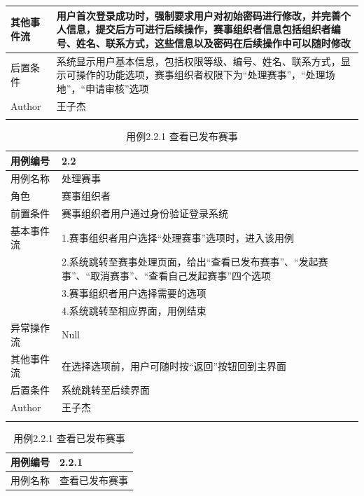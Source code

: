 \documentclass[a4paper,UTF8]{article}
\begin{document}
\begin{table}[H]
\begin{center}
\begin{tabular}{|p{}|p{}|}
		\hline
		其他事件流 & 用户首次登录成功时，强制要求用户对初始密码进行修改，并完善个人信息，提交后方可进行后续操作，赛事组织者信息包括组织者编号、姓名、联系方式，这些信息以及密码在后续操作中可以随时修改\\
		\hline
		后置条件 & 系统显示用户基本信息，包括权限等级、编号、姓名、联系方式，显示可操作的功能选项，赛事组织者权限下为“处理赛事”，“处理场地”，“申请审核”选项\\
		\hline
		Author & 王子杰 \\
		\noalign{\smallskip}
		\hline
		\noalign{\smallskip}
	\end{tabular}
\end{center}
\end{table}

\begin{table}[H]
	\begin{center}
		\caption{用例2.2 处理赛事}
		\label{table:Tab_uc22}
		\begin{tabular}{|p{}|p{}|}
			\hline\noalign{\smallskip}
			用例编号 & 2.2\\
			\hline
			用例名称 &  处理赛事\\
			\hline
			角色 & 赛事组织者\\
			\hline
			前置条件 & 赛事组织者用户通过身份验证登录系统 \\
			\hline
			基本事件流 & 1.赛事组织者用户选择“处理赛事”选项时，进入该用例 \\& 2.系统跳转至赛事处理页面，给出“查看已发布赛事”、“发起赛事”、“取消赛事”、“查看自己发起赛事”四个选项 \\& 3.赛事组织者用户选择需要的选项 \\& 4.系统跳转至相应界面，用例结束\\
			\hline
			异常操作流 & Null \\
			\hline
			其他事件流 & 在选择选项前，用户可随时按“返回”按钮回到主界面 \\
			\hline
			后置条件 & 系统跳转至后续界面 \\
			\hline
			Author & 王子杰 \\
			\noalign{\smallskip}
			\hline
			\noalign{\smallskip}
		\end{tabular}
		\caption{用例2.2.1 查看已发布赛事}
		\label{table:Tab_uc221}
		\begin{tabular}{|p{}|p{}|}
			\hline\noalign{\smallskip}
			用例编号 & 2.2.1\\
			\hline
			用例名称 &  查看已发布赛事\\
			\hline

\end{tabular}
\end{center}
\end{table}
\end{document}
